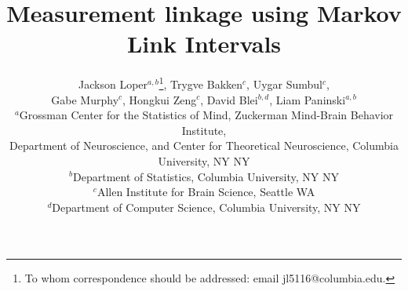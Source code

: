\documentclass{article}
\newcommand{\blind}[2]{#1}
\theoremstyle{definition}
\begin{document}
\title{Measurement linkage using Markov Link Intervals}

\author{\blind{Jackson Loper$^{a,b}$\footnote{To whom correspondence should be addressed: email jl5116@columbia.edu.}, Trygve Bakken$^c$, Uygar Sumbul$^c$, \\ Gabe Murphy$^c$, Hongkui Zeng$^c$, David Blei$^{b,d}$, Liam Paninski$^{a,b}$ \\
\small $^a$Grossman Center for the Statistics of Mind, Zuckerman Mind-Brain Behavior Institute, \\ \small Department of Neuroscience, and Center for Theoretical Neuroscience, Columbia University, NY NY \\
\small $^b$Department of Statistics, Columbia University, NY NY \\
\small $^c$Allen Institute for Brain Science, Seattle WA \\
\small $^d$Department of Computer Science, Columbia University, NY NY}{[Authors blinded]}}

\maketitle

\end{document}
